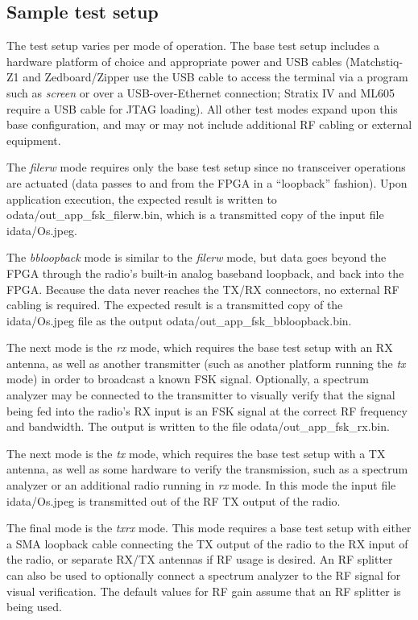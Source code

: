 \subsection{Sample test setup}
The test setup varies per mode of operation. The base test setup includes a hardware platform of choice and appropriate power and USB cables (Matchstiq-Z1 and Zedboard/Zipper use the USB cable to access the terminal via a program such as \textit{screen} or over a USB-over-Ethernet connection; Stratix IV and ML605 require a USB cable for JTAG loading). All other test modes expand upon this base configuration, and may or may not include additional RF cabling or external equipment.\par\medskip
\noindent The \textit{filerw} mode requires only the base test setup since no transceiver operations are actuated (data passes to and from the FPGA in a ``loopback'' fashion). Upon application execution, the expected result is written to odata/out\_app\_fsk\_filerw.bin, which is a transmitted copy of the input file idata/Os.jpeg.\par\medskip
\noindent The \textit{bbloopback} mode is similar to the \textit{filerw} mode, but data goes beyond the FPGA through the radio's built-in analog baseband loopback, and back into the FPGA. Because the data never reaches the TX/RX connectors, no external RF cabling is required. The expected result is a transmitted copy of the idata/Os.jpeg file as the output odata/out\_app\_fsk\_bbloopback.bin.\par\medskip
\noindent The next mode is the \textit{rx} mode, which requires the base test setup with an RX antenna, as well as another transmitter (such as another platform running the \textit{tx} mode) in order to broadcast a known FSK signal. Optionally, a spectrum analyzer may be connected to the transmitter to visually verify that the signal being fed into the radio's RX input is an FSK signal at the correct RF frequency and bandwidth. The output is written to the file odata/out\_app\_fsk\_rx.bin.\par\medskip
\noindent The next mode is the \textit{tx} mode, which requires the base test setup with a TX antenna, as well as some hardware to verify the transmission, such as a spectrum analyzer or an additional radio running in \textit{rx} mode. In this mode the input file idata/Os.jpeg is transmitted out of the RF TX output of the radio.\par\medskip
\noindent The final mode is the \textit{txrx} mode. This mode requires a base test setup with either a SMA loopback cable connecting the TX output of the radio to the RX input of the radio, or separate RX/TX antennas if RF usage is desired. An RF splitter can also be used to optionally connect a spectrum analyzer to the RF signal for visual verification. The default values for RF gain assume that an RF splitter is being used.\par\medskip
